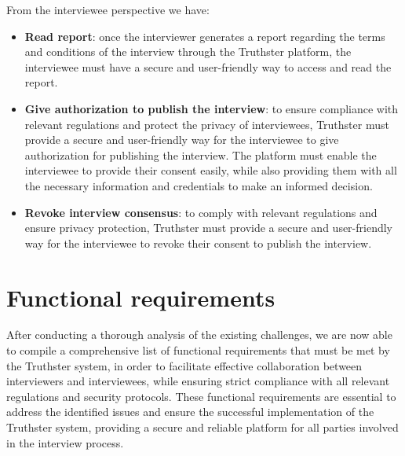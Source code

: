 \documentclass[target=mst,aauheader=]{thud}
\begin{document}
From the interviewee perspective we have:
\begin{itemize}
    \item \textbf{Read report}: once the interviewer generates a report regarding the terms and conditions of the interview through the Truthster platform, the interviewee must have a secure and user-friendly way to access and read the report.
    \item \textbf{Give authorization to publish the interview}: to ensure compliance with relevant regulations and protect the privacy of interviewees, Truthster must provide a secure and user-friendly way for the interviewee to give authorization for publishing the interview. The platform must enable the interviewee to provide their consent easily, while also providing them with all the necessary information and credentials to make an informed decision.
    \item \textbf{Revoke interview consensus}: to comply with relevant regulations and ensure privacy protection, Truthster must provide a secure and user-friendly way for the interviewee to revoke their consent to publish the interview.
\end{itemize}

\section{Functional requirements}

After conducting a thorough analysis of the existing challenges, we are now able to compile a comprehensive list of functional requirements that must be met by the Truthster system, in order to facilitate effective collaboration between interviewers and interviewees, while ensuring strict compliance with all relevant regulations and security protocols. These functional requirements are essential to address the identified issues and ensure the successful implementation of the Truthster system, providing a secure and reliable platform for all parties involved in the interview process.
\end{document}
